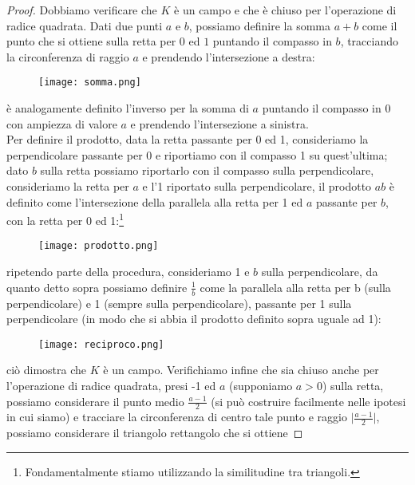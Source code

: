\documentclass[11pt]{scrartcl}
\begin{document}
\begin{proof}
    Dobbiamo verificare che $K$ è un campo e che è chiuso per l'operazione di radice quadrata. Dati due punti $a$ e $b$, possiamo definire la somma $a+b$ come il punto che si ottiene sulla retta per $0$ ed $1$ puntando il compasso in $b$, tracciando la circonferenza di raggio $a$ e prendendo l'intersezione a destra:
    \begin{center}
        \begin{figure}[h]
            \centering
            \texttt{[image: somma.png]}
        \end{figure}
    \end{center}
    è analogamente definito l'inverso per la somma di $a$ puntando il compasso in 0 con ampiezza di valore $a$ e prendendo l'intersezione a sinistra.\\ Per definire il prodotto, data la retta passante per 0 ed 1, consideriamo la perpendicolare passante per 0 
    e riportiamo con il compasso 1 su quest'ultima; dato $b$ sulla retta possiamo riportarlo con il compasso sulla perpendicolare, consideriamo la retta per $a$ e l'1 riportato sulla perpendicolare, il prodotto $ab$ è definito come l'intersezione della parallela alla retta per 1 ed $a$ passante per $b$, con la retta per 0 ed 1:\footnote{Fondamentalmente stiamo utilizzando la similitudine tra triangoli.}
    \begin{center}
        \begin{figure}[h]
            \centering
            \texttt{[image: prodotto.png]}
        \end{figure}
    \end{center}
    ripetendo parte della procedura, consideriamo 1 e $b$ sulla perpendicolare, da quanto detto sopra possiamo definire $\displaystyle\frac{1}{b}$ come la parallela alla retta per b (sulla perpendicolare) e 1 (sempre sulla perpendicolare), passante per 1 sulla perpendicolare (in modo che si abbia il prodotto definito sopra uguale ad 1):
    \begin{center}
        \begin{figure}[h]
            \centering
            \texttt{[image: reciproco.png]}
        \end{figure}
    \end{center}
    ciò dimostra che $K$ è un campo. Verifichiamo infine che sia chiuso anche per l'operazione di radice quadrata, presi -1 ed $a$ (supponiamo $a>0$) sulla retta, possiamo considerare il punto medio $\displaystyle\frac{a-1}{2}$ (si può costruire facilmente nelle ipotesi in cui siamo) e tracciare la circonferenza di centro tale punto e raggio $\displaystyle \Big| \frac{a-1}{2} \Big|$, possiamo considerare il triangolo rettangolo che si ottiene 

\end{proof}
\end{document}
